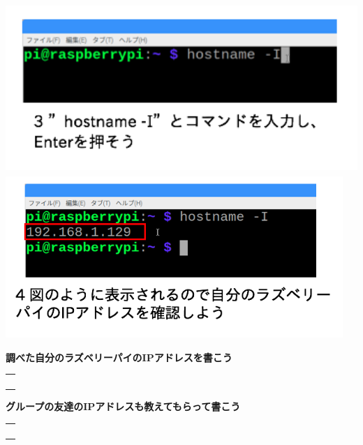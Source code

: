 \documentclass[a4paper,12pt,dvipdfmx]{jarticle}
\begin{document}
\includegraphics[width=13.799cm,height=6.456cm]{ome7-img010.png}
\centering
\includegraphics[width=12.771cm,height=6.128cm]{ome7-img009.png}
\flushleft


\bigskip


\bigskip


\bigskip


\bigskip


\bigskip

{\bfseries
	調べた自分のラズベリーパイのIPアドレスを書こう}

\bigskip


\centering
\begin{tabular}{|p{}|} \hline
	\\
	\\
	\\
	\\ \hline
\end{tabular}


\bigskip


\bigskip

\flushleft

{\bfseries
	グループの友達のIPアドレスも教えてもらって書こう}

\bigskip


\centering
\begin{tabular}{|p{}|} \hline
	\\
	\\
	\\
	\\ \hline
\end{tabular}
\end{document}
